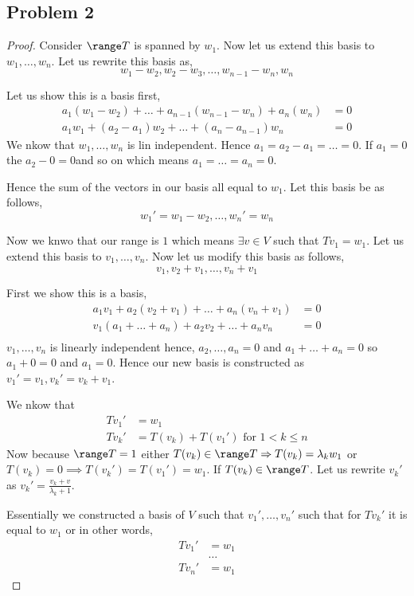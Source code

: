 \documentclass[a4paper]{report}
\begin{document}
\subsection*{Problem 2}
\begin{proof}
    Consider $\range T$ is spanned by $w_1$. Now let us extend this basis to $w_1,\dots,w_n$. Let us rewrite this basis as, 
    $$ w_1 - w_2,w_2 - w_3,\dots,w_{n-1} - w_n,w_{n} $$ 

    Let us show this is a basis first, 
    \begin{align*} 
        a_1(w_1-w_2) + \dots + a_{n-1}(w_{n-1} - w_n) + a_n(w_n) &= 0\\
        a_1w_1 + (a_2-a_1)w_2 + \dots + (a_n - a_{n-1})w_n&= 0
    \end{align*}
    We nkow that $w_1,\dots,w_n$ is lin independent. Hence $a_1 = a_2 - a_1 = \dots = 0$.
    If $a_1 = 0$ the $a_2 - 0 = 0$and so on which means $a_1 = \dots = a_n = 0$.

    Hence the sum of the vectors in our basis all equal to $w_1$. Let this basis be as follows, 
    $$ w_1' = w_1 - w_2, \dots,w_n' = w_n $$ 

    Now we knwo that our range is $1$ which means  $\exists v \in V$ such that $Tv_1 = w_1$. Let us extend this basis to $v_1,\dots,v_n$. Now let us modify this basis as follows, 
    $$ v_1, v_2 + v_1,\dots, v_n + v_1 $$ 

    First we show this is a basis, 
    \begin{align*}
        a_1v_1 + a_2(v_2 + v_1) + \dots + a_n(v_n + v_1) &= 0 \\
        v_1(a_1 + \dots + a_n) + a_2v_2 + \dots + a_nv_n &= 0\\
    \end{align*}
    $v_1,\dots,v_n$ is linearly independent hence, $a_2,\dots,a_n = 0$ and $a_1+ \dots + a_n = 0$ so $a_1 + 0 = 0$ and $a_1 = 0$. Hence our new basis is constructed as $v_1' = v_1, v_k' = v_k + v_1$.

    We nkow that  
    \begin{align*}
    Tv_1' &= w_1\\
    Tv_k' &= T(v_k) + T(v_1') \text{ for $1 < k \le n$}
    \end{align*}
    Now because $\range T = 1$ either $T(v_k) \in \range T \implies T(v_k) = \lambda_k w_1$ or $T(v_k) = 0 \implies T(v_k')= T(v_1') = w_1$. If $T(v_k) \in \range T$. Let us rewrite $v_k'$ as $v_k' = \frac{v_k+ v}{\lambda_k + 1}$.


    Essentially we constructed a basis of $V$ such that $v_1',\dots,v_n'$ such that for $Tv_k'$ it is equal to $w_1$ or in other words, 
    \begin{align*}
        Tv_1' &= w_1\\
              &\dots\\
        Tv_n' &= w_1
    \end{align*}


\end{proof}
\end{document}
